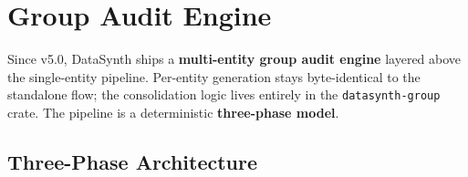 \documentclass[11pt,a4paper]{article}
\begin{document}
\newpage
\section{Group Audit Engine}

Since v5.0, DataSynth ships a \textbf{multi-entity group audit engine}
layered above the single-entity pipeline. Per-entity generation stays
byte-identical to the standalone flow; the consolidation logic lives entirely
in the \texttt{datasynth-group} crate. The pipeline is a deterministic
\textbf{three-phase model}.

\subsection{Three-Phase Architecture}
\end{document}
